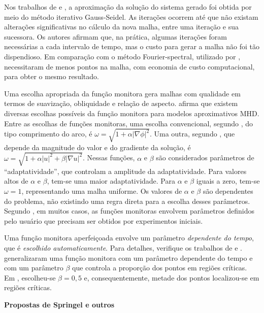 Nos trabalhos de  e , a aproximação da solução do sistema gerado foi obtida por meio do método iterativo Gauss-Seidel. As iterações ocorrem até que não existam alterações significativas no cálculo da nova malha, entre uma iteração e sua sucessora. Os autores afirmam que, na prática, algumas iterações foram necessárias a cada intervalo de tempo, mas o custo para gerar a malha não foi tão dispendioso. Em comparação com o método Fourier-spectral, utilizado por ,  necessitaram de menos pontos na malha, com economia de custo computacional, para obter o mesmo resultado.

Uma escolha apropriada da função monitora gera malhas com qualidade em termos de suavização, obliquidade e relação de aspecto.  afirma que existem diversas escolhas possíveis da função monitora para modelos aproximativos MHD. Entre as escolhas de funções monitoras, uma escolha convencional, segundo , do tipo comprimento do arco, é $\omega = \sqrt{1 + \alpha |\nabla \phi |^2 }$. Uma outra, segundo , que depende da magnitude do valor e do gradiente da solução, é $\omega = \sqrt{1 + \alpha | u |^2 + \beta|\nabla u|^2}$. Nessas funções, $\alpha$ e $\beta$ são considerados parâmetros de ``adaptatividade'', que controlam a amplitude da adaptatividade.  Para valores altos de $\alpha$ e $\beta$, tem-se uma maior adaptatividade. Para $\alpha$ e $\beta$ iguais a zero, tem-se $\omega = 1$, representando uma malha uniforme. Os valores de $\alpha$ e $\beta$ são dependentes do problema, não existindo uma regra direta para a escolha desses parâmetros. Segundo , em muitos casos, as funções monitoras envolvem parâmetros definidos pelo usuário que precisam ser obtidos por experimentos iniciais.

Uma função monitora aperfeiçoada envolve um parâmetro {\it dependente do tempo}, que é {\it escolhido automaticamente}. Para detalhes, verifique os trabalhos de  e .  generalizaram uma função monitora com um parâmetro dependente do tempo e com um parâmetro $\beta$ que controla a proporção dos pontos em regiões críticas. Em , escolheu-se $\beta = 0,5$ e, consequentemente, metade dos pontos localizou-se em regiões críticas.

\textbf{Propostas de Springel e outros}
\label{subcap_propostas_springel_outros}

